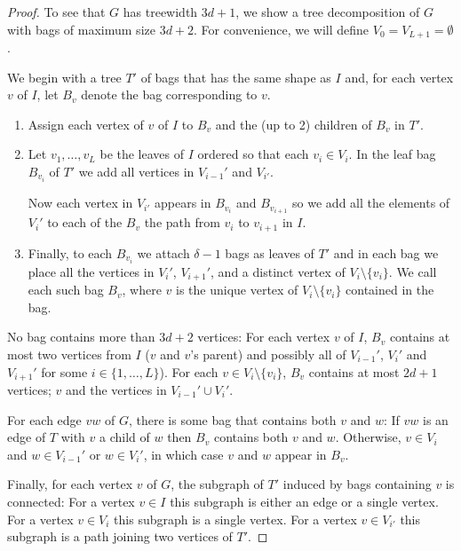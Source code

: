 \documentclass[lotsofwhite]{patmorin}
\begin{document}
\begin{proof}
  To see that $G$ has treewidth $3d+1$, we show a tree decomposition
  of $G$ with bags of maximum size $3d+2$.  For convenience, we will
  define $V_0=V_{L+1}=\emptyset$.

  We begin with a tree $T'$ of bags that has the same shape as $I$ and,
  for each vertex $v$ of $I$, let $B_v$ denote the bag corresponding
  to $v$.
  \begin{enumerate}
    \item Assign each vertex of $v$ of $I$ to $B_v$ and the (up to 2)
      children of $B_v$ in $T'$.

    \item Let $v_1,\ldots,v_L$ be the
     leaves of $I$ ordered so that each $v_i\in V_i$. In the leaf bag
     $B_{v_i}$ of $T'$ we add all vertices in
     $V_{i-1}'$ and $V_{i'}$.

     Now each vertex in $V_{i'}$ appears in $B_{v_i}$ and $B_{v_{i+1}}$
     so we add all the elements of $V_i'$ to each of the $B_v$ the path
     from $v_i$ to $v_{i+1}$ in $I$.

    \item  Finally, to each $B_{v_i}$ we attach $\delta-1$ bags as leaves
     of $T'$ and in each bag we place all the vertices in $V_i'$,
     $V_{i+1}'$, and a distinct vertex of $V_i\setminus\{v_i\}$. We
     call each such bag $B_v$, where $v$ is the unique vertex of
     $V_i\setminus\{v_i\}$ contained in the bag.
  \end{enumerate}

  No bag contains more than $3d+2$ vertices: For each vertex $v$ of
  $I$, $B_v$ contains at most two vertices from $I$ ($v$ and $v$'s
  parent) and possibly all of $V_{i-1}'$, $V_i'$ and $V_{i+1}'$ for
  some $i\in\{1,\ldots,L\}$).  For each $v\in V_i\setminus\{v_i\}$,
  $B_v$ contains at most $2d+1$ vertices; $v$ and the vertices in
  $V_{i-1}'\cup V_{i}'$.

  For each edge $vw$ of $G$, there is some bag that contains both $v$
  and $w$: If $vw$ is an edge of $T$ with $v$ a child of $w$ then $B_v$
  contains both $v$ and $w$. Otherwise, $v\in V_i$ and $w\in V_{i-1}'$
  or $w\in V_{i}'$, in which case $v$ and $w$ appear in $B_v$.

  Finally, for each vertex $v$ of $G$, the subgraph of $T'$ induced by
  bags containing $v$ is connected: For a vertex $v\in I$ this subgraph
  is either an edge or a single vertex.  For a vertex $v\in V_i$ this
  subgraph is a single vertex.  For a vertex $v\in V_{i'}$ this subgraph
  is a path joining two vertices of $T'$.


\end{proof}
\end{document}
